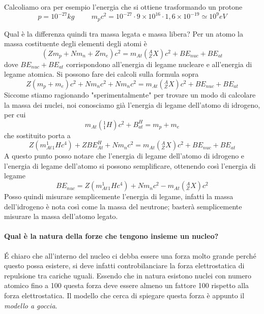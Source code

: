 Calcoliamo ora per esempio l'energia che si ottiene trasformando un protone
\begin{equation}
p=10^{-27}kg\hspace{1cm} m_pc^2= 10^{-27}\cdot 9\times10^{16}\cdot 1,6\times10^{-19}\simeq 10^9 eV
\end{equation}

Qual è la differenza quindi tra massa legata e massa libera?
Per un atomo la massa costituente degli elementi degli atomi è
\begin{equation}
(Zm_p+Nm_n+Zm_e)c^2=m_{At}(^A_ZX)c^2+BE_{nuc}+BE_{at}
\end{equation}
dove $BE_{nuc}+BE_{at}$ corrispondono all'energia di legame nucleare e all'energia di legame atomica.
Si possono fare dei calcoli sulla formula sopra
\begin{equation}
Z(m_p+m_e)c^2+Nm_nc^2+Nm_nc^2=m_{At}(^A_ZX)c^2+BE_{nuc}+BE_{at}
\end{equation}
Siccome stiamo ragionando "sperimentalmente" per trovare un modo di calcolare la massa dei nuclei, noi conosciamo già l'energia di legame dell'atomo di idrogeno, per cui
\begin{equation}
m_{At}(^1_1H)c^2+B_{at}^H=m_p+m_e
\end{equation}
che sostituito porta a 
\begin{equation}
Z({m_{At}^1} {_1H c^4})+ZBE^H_{At}+Nm_nc^2=m_{At}(^A_ZX)c^2+BE_{nuc}+BE_{at}
\end{equation}
A questo punto posso notare che l'energia di legame dell'atomo di idrogeno e l'energia di legame dell'atomo si possono semplificare, ottenendo così l'energia di legame
\begin{equation}
BE_{nuc}=Z(m_{At}^1{_1Hc^4})+Nm_nc^2-m_{At}(^A_ZX)c^2
\end{equation}
Posso quindi misurare semplicemente l'energia di legame, infatti la massa dell'idrogeno è nota così come la massa del neutrone; basterà semplicemente misurare la massa dell'atomo legato.

\paragraph{Qual è la natura della forze che tengono insieme un nucleo?}
\'E chiaro che all'interno del nucleo ci debba essere una forza molto grande perché questo possa esistere, si deve infatti controbilanciare la forza elettrostatica di repulsione tra cariche uguali. 
Essendo che in natura esistono nuclei con numero atomico fino a 100 questa forza deve essere  almeno un fattore 100 rispetto alla forza elettrostatica.
Il modello che cerca di spiegare questa forza è appunto il \emph{modello a goccia}.

